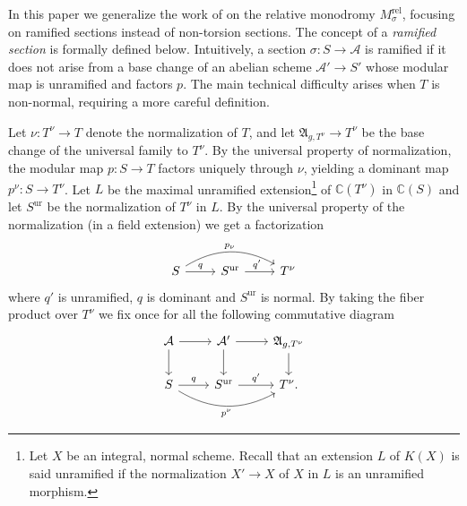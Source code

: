 \documentclass[10 pt,a4paper]{article}
\theoremstyle{plain}
\theoremstyle{definition}
\theoremstyle{named}
\DeclareMathOperator{\ur}{ur}
\newcommand{\cA}{\mathcal A}
\newcommand{\fA}{\mathfrak A}
\begin{document}
In this paper we generalize the work of \cite{CZ} on the relative monodromy $M^{\textrm{rel}}_\sigma$, focusing on ramified sections instead of non-torsion sections. The concept of a \emph{ramified section} is formally defined below. Intuitively, a section $\sigma \colon S \to \cA$ is ramified if it does not arise from a base change of an abelian scheme $\cA' \to S'$ whose modular map is unramified and factors $p$. The main technical difficulty arises when $T$ is non-normal, requiring a more careful definition.

Let $\nu \colon T^\nu \to T$ denote the normalization of $T$, and let $\mathfrak{A}_{g,T^\nu} \to T^\nu$ be the base change of the universal family to $T^\nu$. By the universal property of normalization, the modular map $p \colon S \to T$ factors uniquely through $\nu$, yielding a dominant map $p^\nu \colon S \to T^\nu$. Let $L$ be the maximal unramified extension\footnote{Let $X$ be an integral, normal scheme. Recall that an extension $L$ of $K(X)$ is said unramified if the normalization $X'\to X$ of $X$ in $L$ is an unramified morphism.} of $\mathbb C(T^\nu)$ in $\mathbb C(S)$ and let $S^{\ur}$ be the normalization of $T^\nu$ in $L$.  By the universal property of the normalization (in a field extension) we get a factorization
\begin{equation}\label{eq:pnu}
\begin{tikzcd}
S\arrow{r}{q}\arrow[bend left]{rr}{p_\nu} & S^{\ur} \arrow{r}{q'\;\;} & T^\nu
\end{tikzcd}
\end{equation}
where $q'$ is unramified, $q$ is dominant and $S^{\ur}$ is normal. By taking the fiber product over $T^\nu$ we fix once for all the following commutative diagram
\begin{equation}\label{eq:relNormalization}
	\begin{tikzcd}
		\cA \arrow{d} \arrow{r} & \cA' \arrow{d} \arrow{r} & \fA_{g,T^\nu} \arrow{d}\\
		S \arrow{r}{q} \arrow[bend right, swap]{rr}{p^\nu}& S^{\ur} \arrow{r}{q'} & T^\nu.
	\end{tikzcd}
\end{equation}
\end{document}
